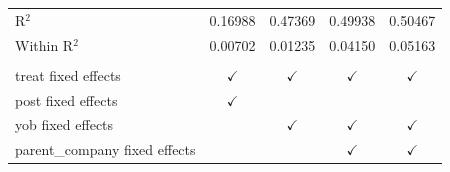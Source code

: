 \begin{table}[htbp]
\begin{tabular}{lcccc}
      R$^2$                          & 0.16988       & 0.47369       & 0.49938       & 0.50467\\  
      Within R$^2$                   & 0.00702       & 0.01235       & 0.04150       & 0.05163\\  
       \\
      treat fixed effects            & $\checkmark$  & $\checkmark$  & $\checkmark$  & $\checkmark$\\   
      post fixed effects             & $\checkmark$  &               &               & \\  
      yob fixed effects              &               & $\checkmark$  & $\checkmark$  & $\checkmark$\\   
      parent\_company fixed effects  &               &               & $\checkmark$  & $\checkmark$\\   
      \bottomrule
   \end{tabular}
\end{table}


